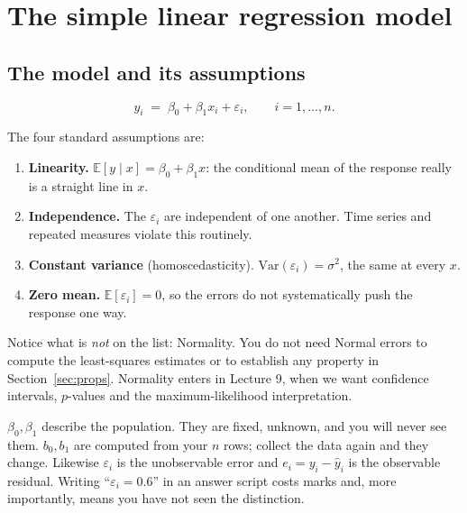 \documentclass[11pt]{article}
\begin{document}
\section{The simple linear regression model}
\label{sec:slr}

\subsection{The model and its assumptions}

\begin{equation}
  y_i \;=\; \beta_0 + \beta_1 x_i + \varepsilon_i, \qquad i = 1,\dots,n .
  \label{eq:slr}
\end{equation}

The four standard assumptions are:

\begin{enumerate}[leftmargin=*]
  \item \textbf{Linearity.} $\mathbb{E}[y \mid x] = \beta_0 + \beta_1 x$: the
    conditional mean of the response really is a straight line in $x$.
  \item \textbf{Independence.} The $\varepsilon_i$ are independent of one
    another. Time series and repeated measures violate this routinely.
  \item \textbf{Constant variance} (homoscedasticity).
    $\mathrm{Var}(\varepsilon_i) = \sigma^2$, the same at every $x$.
  \item \textbf{Zero mean.} $\mathbb{E}[\varepsilon_i] = 0$, so the errors do
    not systematically push the response one way.
\end{enumerate}

Notice what is \emph{not} on the list: Normality. You do not need Normal
errors to compute the least-squares estimates or to establish any property in
Section~\ref{sec:props}. Normality enters in Lecture 9, when we want
confidence intervals, $p$-values and the maximum-likelihood interpretation.

\begin{caution}
$\beta_0,\beta_1$ describe the population. They are fixed, unknown, and you
will never see them. $b_0,b_1$ are computed from your $n$ rows; collect the
data again and they change. Likewise $\varepsilon_i$ is the unobservable
error and $e_i = y_i - \hat y_i$ is the observable residual. Writing
``$\varepsilon_i = 0.6$'' in an answer script costs marks and, more
importantly, means you have not seen the distinction.
\end{caution}
\end{document}
